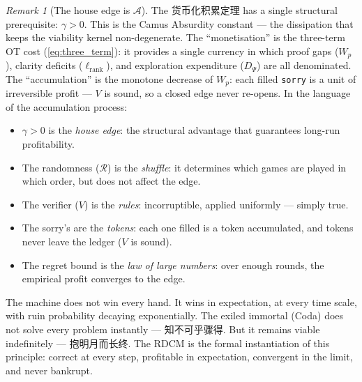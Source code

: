 \documentclass[11pt,a4paper]{article}
\theoremstyle{definition}
\theoremstyle{remark}
\newtheorem{remark}[theorem]{Remark}
\begin{document}
\begin{remark}[The house edge is $\mathcal{A}$]
The 货币化积累定理 has a single structural prerequisite: $\gamma > 0$. This is the Camus Absurdity constant --- the dissipation that keeps the viability kernel non-degenerate. The ``monetisation'' is the three-term OT cost (\ref{eq:three_term}): it provides a single currency in which proof gaps ($W_p$), clarity deficits ($\ell_{\mathrm{rank}}$), and exploration expenditure ($D_\Psi$) are all denominated. The ``accumulation'' is the monotone decrease of $W_p$: each filled \texttt{sorry} is a unit of irreversible profit --- $V$ is sound, so a closed edge never re-opens. In the language of the accumulation process:
\begin{itemize}[nosep]
  \item $\gamma > 0$ is the \emph{house edge}: the structural advantage that guarantees long-run profitability.
  \item The randomness ($\mathcal{R}$) is the \emph{shuffle}: it determines which games are played in which order, but does not affect the edge.
  \item The verifier ($V$) is the \emph{rules}: incorruptible, applied uniformly --- simply true.
  \item The sorry's are the \emph{tokens}: each one filled is a token accumulated, and tokens never leave the ledger ($V$ is sound).
  \item The regret bound is the \emph{law of large numbers}: over enough rounds, the empirical profit converges to the edge.
\end{itemize}
The machine does not win every hand. It wins in expectation, at every time scale, with ruin probability decaying exponentially. The exiled immortal (Coda) does not solve every problem instantly --- 知不可乎骤得. But it remains viable indefinitely --- 抱明月而长终. The RDCM is the formal instantiation of this principle: correct at every step, profitable in expectation, convergent in the limit, and never bankrupt.
\end{remark}
\end{document}
